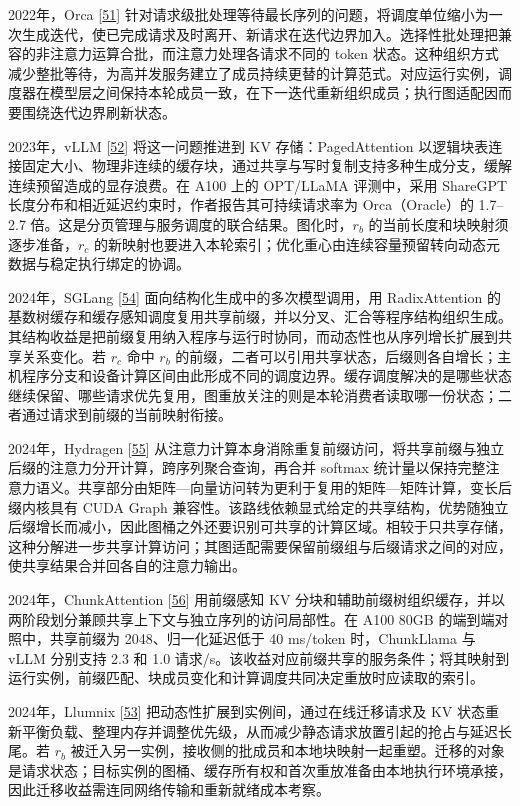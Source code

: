 \documentclass[UTF8,10.5pt,fontset=windows]{ctexart}
\begin{document}
2022年，Orca {[}\protect\hyperlink{ref-yu2022orca}{51}{]}
针对请求级批处理等待最长序列的问题，将调度单位缩小为一次生成迭代，使已完成请求及时离开、新请求在迭代边界加入。选择性批处理把兼容的非注意力运算合批，而注意力处理各请求不同的
token
状态。这种组织方式减少整批等待，为高并发服务建立了成员持续更替的计算范式。对应运行实例，调度器在模型层之间保持本轮成员一致，在下一迭代重新组织成员；执行图适配因而要围绕迭代边界刷新状态。

2023年，vLLM {[}\protect\hyperlink{ref-kwon2023vllm}{52}{]}
将这一问题推进到 KV 存储：PagedAttention
以逻辑块表连接固定大小、物理非连续的缓存块，通过共享与写时复制支持多种生成分支，缓解连续预留造成的显存浪费。在
A100 上的 OPT/LLaMA 评测中，采用 ShareGPT
长度分布和相近延迟约束时，作者报告其可持续请求率为 Orca（Oracle）的
1.7--2.7 倍。这是分页管理与服务调度的联合结果。图化时，\(r_b\)
的当前长度和块映射须逐步准备，\(r_c\)
的新映射也要进入本轮索引；优化重心由连续容量预留转向动态元数据与稳定执行绑定的协调。

2024年，SGLang {[}\protect\hyperlink{ref-zheng2024sglang}{54}{]}
面向结构化生成中的多次模型调用，用 RadixAttention
的基数树缓存和缓存感知调度复用共享前缀，并以分叉、汇合等程序结构组织生成。其结构收益是把前缀复用纳入程序与运行时协同，而动态性也从序列增长扩展到共享关系变化。若
\(r_c\) 命中 \(r_b\)
的前缀，二者可以引用共享状态，后缀则各自增长；主机程序分支和设备计算区间由此形成不同的调度边界。缓存调度解决的是哪些状态继续保留、哪些请求优先复用，图重放关注的则是本轮消费者读取哪一份状态；二者通过请求到前缀的当前映射衔接。

2024年，Hydragen {[}\protect\hyperlink{ref-juravsky2024hydragen}{55}{]}
从注意力计算本身消除重复前缀访问，将共享前缀与独立后缀的注意力分开计算，跨序列聚合查询，再合并
softmax
统计量以保持完整注意力语义。共享部分由矩阵---向量访问转为更利于复用的矩阵---矩阵计算，变长后缀内核具有
CUDA Graph
兼容性。该路线依赖显式给定的共享结构，优势随独立后缀增长而减小，因此图桶之外还要识别可共享的计算区域。相较于只共享存储，这种分解进一步共享计算访问；其图适配需要保留前缀组与后缀请求之间的对应，使共享结果合并回各自的注意力输出。

2024年，ChunkAttention
{[}\protect\hyperlink{ref-ye2024chunkattention}{56}{]} 用前缀感知 KV
分块和辅助前缀树组织缓存，并以两阶段划分兼顾共享上下文与独立序列的访问局部性。在
A100 80GB 的端到端对照中，共享前缀为 2048、归一化延迟低于 40 ms/token
时，ChunkLlama 与 vLLM 分别支持 2.3 和 1.0
请求/s。该收益对应前缀共享的服务条件；将其映射到运行实例，前缀匹配、块成员变化和计算调度共同决定重放时应读取的索引。

2024年，Llumnix {[}\protect\hyperlink{ref-sun2024llumnix}{53}{]}
把动态性扩展到实例间，通过在线迁移请求及 KV
状态重新平衡负载、整理内存并调整优先级，从而减少静态请求放置引起的抢占与延迟长尾。若
\(r_b\)
被迁入另一实例，接收侧的批成员和本地块映射一起重塑。迁移的对象是请求状态；目标实例的图桶、缓存所有权和首次重放准备由本地执行环境承接，因此迁移收益需连同网络传输和重新就绪成本考察。
\end{document}

